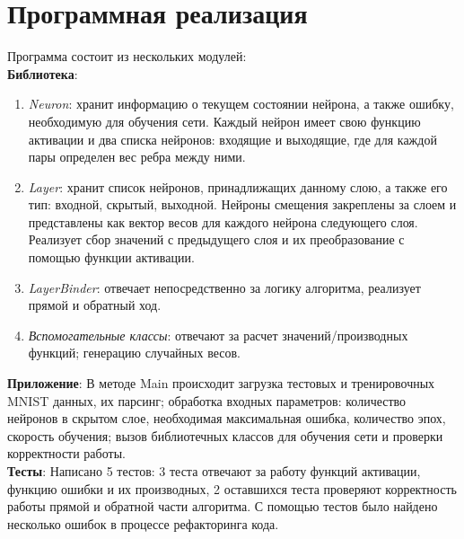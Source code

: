 \documentclass{article}
\begin{document}
\section{Программная реализация}
Программа состоит из нескольких модулей:
\vspace{3mm} \\
\textbf{Библиотека}:
\begin{enumerate}
	\item \textit{Neuron}: хранит информацию о текущем состоянии нейрона, а также ошибку, необходимую для обучения сети. Каждый нейрон имеет свою функцию активации и два списка нейронов: входящие и выходящие, где для каждой пары определен вес ребра между ними.
	\item \textit{Layer}: хранит список нейронов, принадлижащих данному слою, а также его тип: входной, скрытый, выходной. Нейроны смещения закреплены за слоем и представлены как вектор весов для каждого нейрона следующего слоя. Реализует сбор значений с предыдущего слоя и их преобразование с помощью функции активации.
	\item \textit{LayerBinder}: отвечает непосредственно за логику алгоритма, реализует прямой и обратный ход.
	\item \textit{Вспомогательные классы}: отвечают за расчет значений/производных функций; генерацию случайных весов.
\end{enumerate}
\textbf{Приложение}:
В методе Main происходит загрузка тестовых и тренировочных MNIST данных, их парсинг; обработка входных параметров: количество нейронов в скрытом слое, необходимая максимальная ошибка, количество эпох, скорость обучения; вызов библиотечных классов для обучения сети и проверки корректности работы.
\vspace{3mm} \\
\textbf{Тесты}:
Написано 5 тестов: 3 теста отвечают за работу функций активации, функцию ошибки и их производных, 2 оставшихся теста проверяют корректность работы прямой и обратной части алгоритма. С помощью тестов было найдено несколько ошибок в процессе рефакторинга кода.
\end{document}
